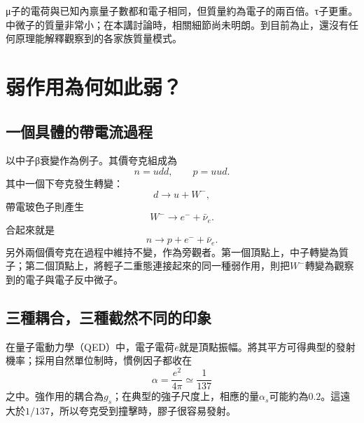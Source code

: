 {\proseunicodefont μ}子的電荷與已知內禀量子數都和電子相同，但質量約為電子的兩百倍。{\proseunicodefont τ}子更重。中微子的質量非常小；在本講討論時，相關細節尚未明朗。到目前為止，還沒有任何原理能解釋觀察到的各家族質量模式。

\begin{classroomqa}
\end{classroomqa}

\section{弱作用為何如此弱？}

\subsection{一個具體的帶電流過程}

以中子{\proseunicodefont β}衰變作為例子。其價夸克組成為
\begin{equation}
  n=udd,\qquad p=uud.
\end{equation}
其中一個下夸克發生轉變：
\begin{equation}
  d\longrightarrow u+W^-,
\end{equation}
帶電玻色子則產生
\begin{equation}
  W^-\longrightarrow e^-+\bar\nu_e.
\end{equation}
合起來就是
\begin{equation}
  n\longrightarrow p+e^-+\bar\nu_e.
\end{equation}
另外兩個價夸克在過程中維持不變，作為旁觀者。第一個頂點上，中子轉變為質子；第二個頂點上，將輕子二重態連接起來的同一種弱作用，則把\(W^-\)轉變為觀察到的電子與電子反中微子。

\subsection{三種耦合，三種截然不同的印象}

在量子電動力學（QED）中，電子電荷\(e\)就是頂點振幅。將其平方可得典型的發射機率；採用自然單位制時，慣例因子都收在
\begin{equation}
  \alpha=\frac{e^2}{4\pi}\simeq\frac1{137}
\end{equation}
之中。強作用的耦合為\(g_s\)；在典型的強子尺度上，相應的量\(\alpha_s\)可能約為\(0.2\)。這遠大於\(1/137\)，所以夸克受到撞擊時，膠子很容易發射。

